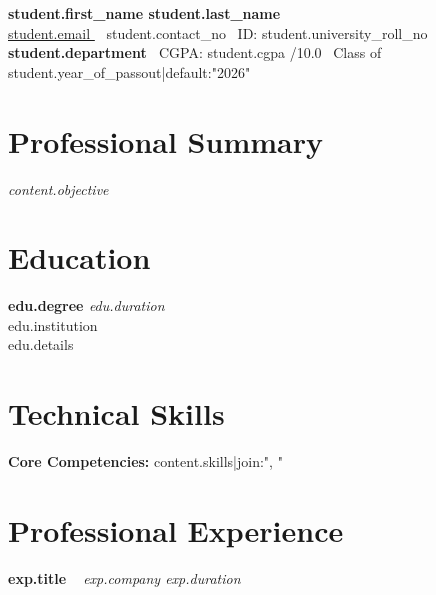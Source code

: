 \documentclass[a4paper,11pt]{article}
\begin{document}
\enlargethispage{2\baselineskip}

\begin{center}
    {\Huge \textbf{ {{ student.first_name }} {{ student.last_name }} }} \\
    \vspace{3mm}
    \href{mailto:{{ student.email }}}{ {{ student.email }} } \textbar\ {{ student.contact_no }} \textbar\ ID: {{ student.university_roll_no }} \\
    \textbf{ {{ student.department }} } \textbar\ CGPA: {{ student.cgpa }}/10.0 \textbar\ Class of {{ student.year_of_passout|default:"2026" }}
\end{center}

\vspace{3mm}

{%
\section*{Professional Summary}
\textit{ {{ content.objective }} }
{%

{%
\section*{Education}
{%
    \textbf{ {{ edu.degree }} } \hfill \textit{ {{ edu.duration }} } \\
    {{ edu.institution }} \\ {{ edu.details }}
    \vspace{1mm}
{%
{%

{%
\section*{Technical Skills}
\textbf{Core Competencies:} {{ content.skills|join:", " }}
{%

{%
\section*{Professional Experience}
{%
    \textbf{ {{ exp.title }} } \textbar\ \textit{ {{ exp.company }} } \hfill \textit{ {{ exp.duration }} }
    {%
    {%
{%
{%

}}}}}}}}}}}}}}
\end{document}
